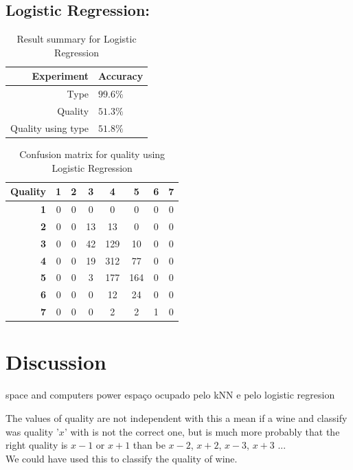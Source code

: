 \documentclass[twoside]{article}
\begin{document}
\begin{multicols}{2}
\subsection*{\textbf{Logistic Regression:}}
\begin{table}[H]
\caption{Result summary for Logistic Regression}
\centering
\begin{tabular}{r|l}
\textbf{Experiment} & \textbf{Accuracy}\\
\midrule
Type & $99.6\%$\\
Quality & $51.3\%$\\
Quality using type & $51.8\%$\\
\end{tabular}
\end{table}


\begin{table}[H]
\caption{Confusion matrix for quality using Logistic Regression}
\centering
\begin{tabular}{r||c|c|c|c|c|c|c}
\textbf{Quality} & \textbf{1} & \textbf{2} & \textbf{3} & \textbf{4} & \textbf{5} & \textbf{6} & \textbf{7}\\
\hline \hline
\textbf{1} & 0 & 0 & 0 & 0 & 0 & 0 & 0\\
\hline
\textbf{2} & 0 & 0 & 13 & 13 & 0 & 0 & 0\\
\hline
\textbf{3} & 0 & 0 & 42 & 129 & 10 & 0 & 0\\
\hline
\textbf{4} & 0 & 0 & 19 & 312 & 77 & 0 & 0\\
\hline
\textbf{5} & 0 & 0 & 3 & 177 & 164 & 0 & 0\\
\hline
\textbf{6} & 0 & 0 & 0 & 12 & 24 & 0 & 0\\
\hline
\textbf{7} & 0 & 0 & 0 & 2 & 2 & 1 & 0\\
\end{tabular}
\end{table}



\section{Discussion}

space and computers power
espaço ocupado pelo kNN e pelo logistic regresion

The values of quality are not independent with this a mean if a wine and classify was quality '$x$' with is not the correct one, but is much more probably that the right quality is $x-1$ or $x+1$ than be $x-2$, $x+2$, $x-3$, $x+3$ ... \\
We could have used this to classify the quality of wine.



\end{multicols}
\end{document}
